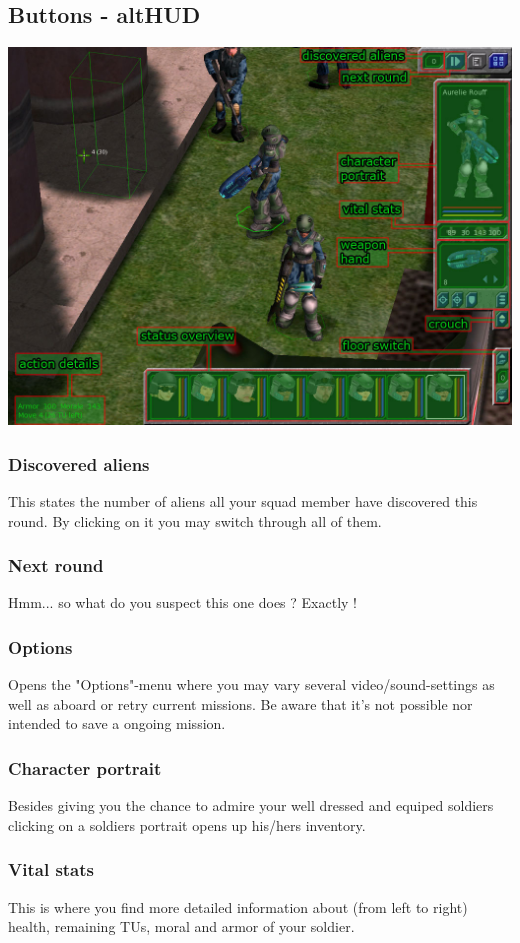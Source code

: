 \subsection{Buttons - altHUD}

\includegraphics[width=\textwidth]{images/altHUD_final.jpg}\\

\subsubsection{Discovered aliens}
This states the number of aliens all your squad member have discovered this round. By clicking on it you may switch through all of them.
\subsubsection{Next round}
Hmm... so what do you suspect this one does ? Exactly !
\subsubsection{Options}
Opens the "Options"-menu where you may vary several video/sound-settings as well as aboard or retry current missions. Be aware that it's not possible nor intended to save a ongoing mission.
\subsubsection{Character portrait}
Besides giving you the chance to admire your well dressed and equiped soldiers clicking on a soldiers portrait opens up his/hers inventory.
\subsubsection{Vital stats}
This is where you find more detailed information about (from left to right) health, remaining TUs, moral and armor of your soldier.
